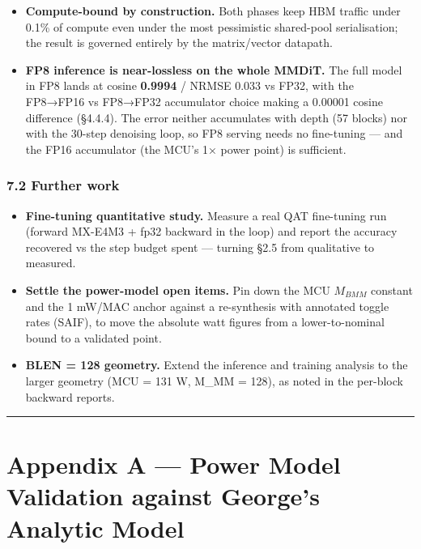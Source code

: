 \documentclass[
  10pt,
]{article}
\providecommand{\tightlist}{%
  \setlength{\itemsep}{0pt}\setlength{\parskip}{0pt}}
\begin{document}
\begin{itemize}
  reuses the backward kernels for a bounded number of calibration / QAT
  steps to bridge high-precision training to low-precision serving --- no
  new kernel set.
\item
  \textbf{Compute-bound by construction.} Both phases keep HBM traffic
  under 0.1\% of compute even under the most pessimistic shared-pool
  serialisation; the result is governed entirely by the matrix/vector
  datapath.
\item
  \textbf{FP8 inference is near-lossless on the whole MMDiT.} The full model
  in FP8 lands at cosine \textbf{0.9994} / NRMSE 0.033 vs FP32, with the
  FP8→FP16 vs FP8→FP32 accumulator choice making a 0.00001 cosine
  difference (§4.4.4). The error neither accumulates with depth (57 blocks)
  nor with the 30-step denoising loop, so FP8 serving needs no fine-tuning
  — and the FP16 accumulator (the MCU's 1× power point) is sufficient.
\end{itemize}

\subsubsection{7.2 Further work}\label{further-work}

\begin{itemize}
\tightlist
\item
  \textbf{Fine-tuning quantitative study.} Measure a real QAT fine-tuning
  run (forward MX-E4M3 + fp32 backward in the loop) and report the
  accuracy recovered vs the step budget spent --- turning §2.5 from
  qualitative to measured.
\item
  \textbf{Settle the power-model open items.} Pin down the MCU
  \(M_{BMM}\) constant and the 1 mW/MAC anchor against a re-synthesis with
  annotated toggle rates (SAIF), to move the absolute watt figures from a
  lower-to-nominal bound to a validated point.
\item
  \textbf{BLEN = 128 geometry.} Extend the inference and training analysis
  to the larger geometry (MCU = 131 W, M\_MM = 128), as noted in the
  per-block backward reports.
\end{itemize}

\begin{center}\rule{0.5\linewidth}{0.5pt}\end{center}


\section{Appendix A --- Power Model Validation against George's Analytic
Model}\label{appendix-a-power-model-validation-against-georges-analytic-model}
\end{document}
